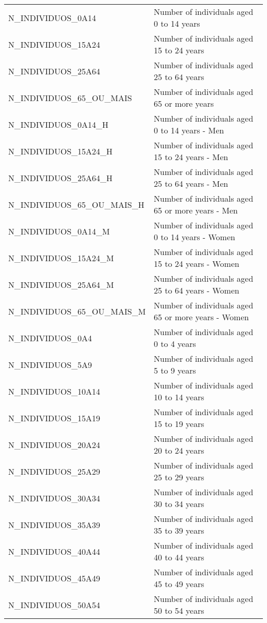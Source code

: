 \begin{xltabular}{\textwidth}{|p{0.4\textwidth}|p{0.6\textwidth}|}
  N\_INDIVIDUOS\_0A14 & Number of individuals aged 0 to 14 years \\
  N\_INDIVIDUOS\_15A24 & Number of individuals aged 15 to 24 years \\
  N\_INDIVIDUOS\_25A64 & Number of individuals aged 25 to 64 years \\
  N\_INDIVIDUOS\_65\_OU\_MAIS & Number of individuals aged 65 or more years \\
  N\_INDIVIDUOS\_0A14\_H & Number of individuals aged 0 to 14 years - Men \\
  N\_INDIVIDUOS\_15A24\_H & Number of individuals aged 15 to 24 years - Men \\
  N\_INDIVIDUOS\_25A64\_H & Number of individuals aged 25 to 64 years - Men \\
  N\_INDIVIDUOS\_65\_OU\_MAIS\_H & Number of individuals aged 65 or more years - Men \\
  N\_INDIVIDUOS\_0A14\_M & Number of individuals aged 0 to 14 years - Women \\
  N\_INDIVIDUOS\_15A24\_M & Number of individuals aged 15 to 24 years - Women \\
  N\_INDIVIDUOS\_25A64\_M & Number of individuals aged 25 to 64 years - Women \\
  N\_INDIVIDUOS\_65\_OU\_MAIS\_M & Number of individuals aged 65 or more years - Women \\
  N\_INDIVIDUOS\_0A4 & Number of individuals aged 0 to 4 years \\
  N\_INDIVIDUOS\_5A9 & Number of individuals aged 5 to 9 years \\
  N\_INDIVIDUOS\_10A14 & Number of individuals aged 10 to 14 years \\
  N\_INDIVIDUOS\_15A19 & Number of individuals aged 15 to 19 years \\
  N\_INDIVIDUOS\_20A24 & Number of individuals aged 20 to 24 years \\
  N\_INDIVIDUOS\_25A29 & Number of individuals aged 25 to 29 years \\
  N\_INDIVIDUOS\_30A34 & Number of individuals aged 30 to 34 years \\
  N\_INDIVIDUOS\_35A39 & Number of individuals aged 35 to 39 years \\
  N\_INDIVIDUOS\_40A44 & Number of individuals aged 40 to 44 years \\
  N\_INDIVIDUOS\_45A49 & Number of individuals aged 45 to 49 years \\
  N\_INDIVIDUOS\_50A54 & Number of individuals aged 50 to 54 years \\

\end{xltabular}
